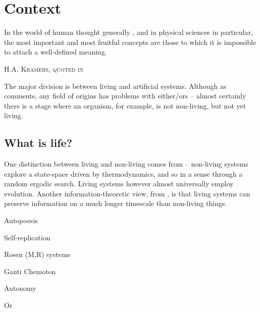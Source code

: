 \chapter{Context}

\epigraph{%
In the world of human thought generally , and in physical sciences in particular, the most important and most fruitful concepts are those to which it is impossible to attach a well-defined meaning.}%
{\textsc{H.A. Kramers, quoted in \autocite{Bruylants2010}}}

The major division is between living and artificial systems. Although as \autocite{Bruylants2010} comments, any field of origins has problems with
either/ors -- almost certainly there is a stage where an organism, for example, is not non-living, but not yet living.


\section{What is life?}\label{what-is-life}

One distinction between living and non-living comes from \autocite{Rasmussen2004} -- non-living systems explore a state-space driven by thermodynamics, and so in a sense through a random ergodic search. Living systems however almost universally employ evolution. Another information-theoretic view, from \autocite{Adami2015}, is that living systems can preserve information on a much longer timescale than non-living things.

Autopoesis

Self-replication

Rosen (M,R) systems

Ganti Chemoton

Autonomy

Or 

